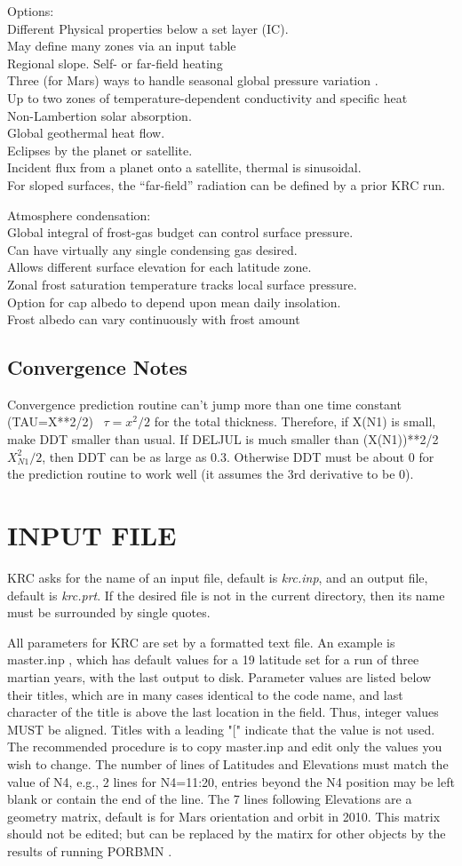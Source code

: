 \documentclass{article}
\newcommand{\qi}{\\ \hspace*{2.em}}      %
\newcommand{\qii}{\\ \hspace*{4.em}}     %
\newcommand{\nf}{\textit}  %
\begin{document}
Options:
\qi  Different Physical properties below a set layer (IC). 
\qii May define many zones via an input table
\qi  Regional slope. Self- or far-field heating
\qi  Three (for Mars) ways to handle seasonal global pressure variation .
\qi  Up to two zones of temperature-dependent conductivity and specific heat
\qi Non-Lambertion solar absorption.
\qi Global geothermal heat flow.
\qi Eclipses by the planet or satellite.
\qi Incident flux from a planet onto a satellite, thermal is sinusoidal.
\qi For sloped surfaces, the ``far-field'' radiation can be defined by a prior KRC run.

Atmosphere condensation: 
\qi Global integral of frost-gas budget can control surface pressure.
\qii Can have virtually any single condensing gas desired.
\qi Allows different surface elevation for each latitude zone.
\qii  Zonal frost saturation temperature tracks local surface pressure.
\qi Option for cap albedo to depend upon mean daily insolation.
\qii Frost albedo can vary continuously with frost amount

\subsection{Convergence Notes} %

Convergence prediction routine can't jump more than one time constant
(TAU=X**2/2) \ $\tau =x^2/2$ for the total thickness.  Therefore, if X(N1) is
small, make DDT smaller than usual.  If DELJUL is much smaller than (X(N1))**2/2
\ $X_{N1}^2/2$, then DDT can be as large as 0.3.  Otherwise DDT must be about 0
for the prediction routine to work well (it assumes the 3rd derivative to be 0).

\section{INPUT FILE}

KRC asks for the name of an input file, default is \nf{krc.inp}, and an output
file, default is \nf{krc.prt}. If the desired file is not in the current
directory, then its name must be surrounded by single quotes.

All parameters for KRC are set by a formatted text file.  An example is
master.inp , which has default values for a 19 latitude set for a run of three
martian years, with the last output to disk. Parameter values are listed below
their titles, which are in many cases identical to the code name, and last
character of the title is above the last location in the field. Thus, integer
values MUST be aligned. Titles with a leading "[" indicate that the value is not
  used. The recommended procedure is to copy master.inp and edit only the values
  you wish to change. The number of lines of Latitudes and Elevations must match
  the value of N4, e.g., 2 lines for N4=11:20, entries beyond the N4 position
  may be left blank or contain the end of the line. The 7 lines following
  Elevations are a geometry matrix, default is for Mars orientation and orbit in
  2010. This matrix should not be edited; but can be replaced by the matirx for
  other objects by the results of running PORBMN .
\end{document}
